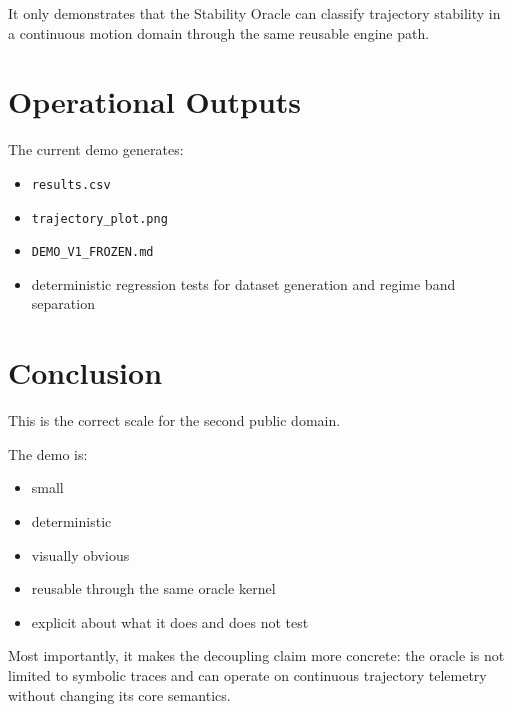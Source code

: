\documentclass[11pt]{article}
\begin{document}
It only demonstrates that the Stability Oracle can classify trajectory stability in a continuous motion domain through the same reusable engine path.

\section{Operational Outputs}

The current demo generates:

\begin{itemize}
\item \texttt{results.csv}
\item \texttt{trajectory\_plot.png}
\item \texttt{DEMO\_V1\_FROZEN.md}
\item deterministic regression tests for dataset generation and regime band separation
\end{itemize}

\section{Conclusion}

This is the correct scale for the second public domain.

The demo is:

\begin{itemize}
\item small
\item deterministic
\item visually obvious
\item reusable through the same oracle kernel
\item explicit about what it does and does not test
\end{itemize}

Most importantly, it makes the decoupling claim more concrete:
the oracle is not limited to symbolic traces and can operate on continuous trajectory telemetry without changing its core semantics.
\end{document}
